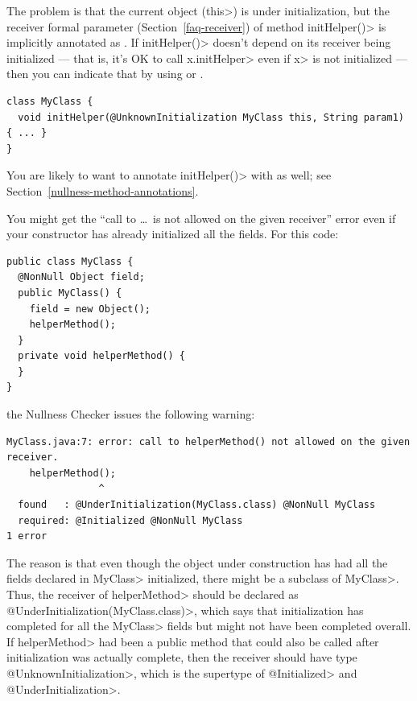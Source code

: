 The problem is that the current object (\<this>) is under initialization,
but the receiver formal parameter (Section~\ref{faq-receiver}) of method
\<initHelper()> is implicitly annotated as
.  If
\<initHelper()> doesn't depend on its receiver being initialized --- that
is, it's OK to call \<x.initHelper> even if \<x> is not initialized ---
then you can indicate that by using
 or
.

\begin{Verbatim}
class MyClass {
  void initHelper(@UnknownInitialization MyClass this, String param1) { ... }
}
\end{Verbatim}

\noindent
You are likely to want to annotate \<initHelper()> with
 as well; see
Section~\ref{nullness-method-annotations}.

You might get the ``call to \ldots\ is not allowed on the given receiver''
error even if your constructor has already initialized all the fields.
For this code:

\begin{Verbatim}
public class MyClass {
  @NonNull Object field;
  public MyClass() {
    field = new Object();
    helperMethod();
  }
  private void helperMethod() {
  }
}
\end{Verbatim}

\noindent
the Nullness Checker issues the following warning:

\begin{Verbatim}
MyClass.java:7: error: call to helperMethod() not allowed on the given receiver.
    helperMethod();
                ^
  found   : @UnderInitialization(MyClass.class) @NonNull MyClass
  required: @Initialized @NonNull MyClass
1 error
\end{Verbatim}

\begin{sloppypar}
The reason is that even though the object under construction has had all
the fields declared in \<MyClass> initialized, there might be a subclass of
\<MyClass>.  Thus, the receiver of \<helperMethod> should be declared as
\<@UnderInitialization(MyClass.class)>, which says that initialization has
completed for all the \<MyClass> fields but might not have been completed
overall.  If \<helperMethod> had been a public method that could also be called after
initialization was actually complete, then the receiver should have type
\<@UnknownInitialization>, which is the supertype of
\<@Initialized> and \<@UnderInitialization>.
\end{sloppypar}


